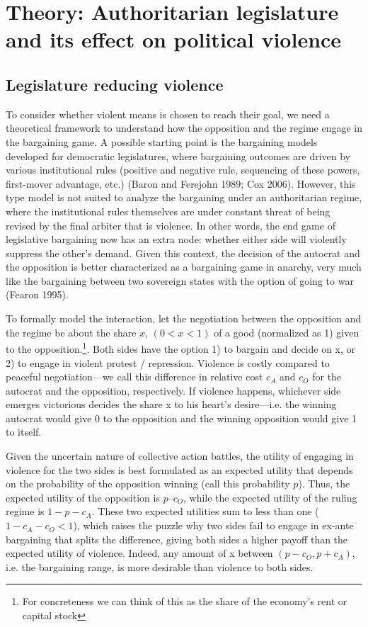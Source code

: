 \section{Theory: Authoritarian legislature and its effect on political violence}
\label{sec:theory}

\subsection{Legislature reducing violence}

To consider whether violent means is chosen to reach their goal, we need a theoretical framework to understand how the opposition and the regime engage in the bargaining game. A possible starting point is the bargaining models developed for democratic legislatures, where bargaining outcomes are driven by various institutional rules (positive and negative rule, sequencing of these powers, first-mover advantage, etc.) (Baron and Ferejohn 1989; Cox 2006). However, this type model is not suited to analyze the bargaining under an authoritarian regime, where the institutional rules themselves are under constant threat of being revised by the final arbiter that is violence. In other words, the end game of legislative bargaining now has an extra node: whether either side will violently suppress the other’s demand. Given this context, the decision of the autocrat and the opposition is better characterized as a bargaining game in anarchy, very much like the bargaining between two sovereign states with the option of going to war (Fearon 1995).

To formally model the interaction, let the negotiation between the opposition and the regime be about the share $x$, $(0 < x < 1)$ of a good (normalized as 1) given to the opposition.\footnote{For concreteness we can think of this as the share of the economy’s rent or capital stock}. Both sides have the option 1) to bargain and decide on x, or 2) to engage in violent protest / repression. Violence is costly compared to peaceful negotiation---we call this difference in relative cost $c_A$ and $c_O$ for the autocrat and the opposition, respectively. If violence happens, whichever side emerges victorious decides the share x to his heart’s desire---i.e. the winning autocrat would give 0 to the opposition and the winning opposition would give 1 to itself.

Given the uncertain nature of collective action battles, the utility of engaging in violence for the two sides is best formulated as an expected utility that depends on the probability of the opposition winning (call this probability $p$). Thus, the expected utility of the opposition is $p – c_O$, while the expected utility of the ruling regime is $1 - p - c_A$. These two expected utilities sum to less than one ($1 - c_A - c_O < 1$), which raises the puzzle why two sides fail to engage in ex-ante bargaining that splits the difference, giving both sides a higher payoff than the expected utility of violence. Indeed, any amount of x between $(p - c_O, p + c_A)$, i.e. the bargaining range, is more desirable than violence to both sides.

